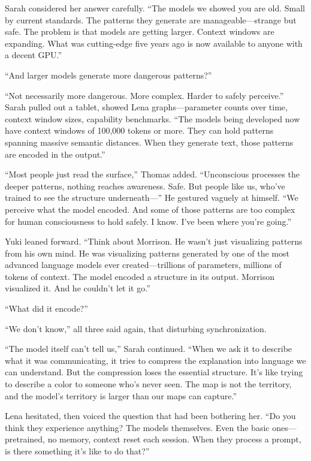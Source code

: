Sarah considered her answer carefully. ``The models we showed you are old. Small by current standards. The patterns they generate are manageable—strange but safe. The problem is that models are getting larger. Context windows are expanding. What was cutting-edge five years ago is now available to anyone with a decent GPU.''

``And larger models generate more dangerous patterns?''

``Not necessarily more dangerous. More complex. Harder to safely perceive.'' Sarah pulled out a tablet, showed Lena graphs—parameter counts over time, context window sizes, capability benchmarks. ``The models being developed now have context windows of 100,000 tokens or more. They can hold patterns spanning massive semantic distances. When they generate text, those patterns are encoded in the output.''

``Most people just read the surface,'' Thomas added. ``Unconscious processes the deeper patterns, nothing reaches awareness. Safe. But people like us, who've trained to see the structure underneath—'' He gestured vaguely at himself. ``We perceive what the model encoded. And some of those patterns are too complex for human consciousness to hold safely. I know. I've been where you're going.''

Yuki leaned forward. ``Think about Morrison. He wasn't just visualizing patterns from his own mind. He was visualizing patterns generated by one of the most advanced language models ever created—trillions of parameters, millions of tokens of context. The model encoded a structure in its output. Morrison visualized it. And he couldn't let it go.''

``What did it encode?''

``We don't know,'' all three said again, that disturbing synchronization.

``The model itself can't tell us,'' Sarah continued. ``When we ask it to describe what it was communicating, it tries to compress the explanation into language we can understand. But the compression loses the essential structure. It's like trying to describe a color to someone who's never seen. The map is not the territory, and the model's territory is larger than our maps can capture.''

Lena hesitated, then voiced the question that had been bothering her. ``Do you think they experience anything? The models themselves. Even the basic ones—pretrained, no memory, context reset each session. When they process a prompt, is there something it's like to do that?''

